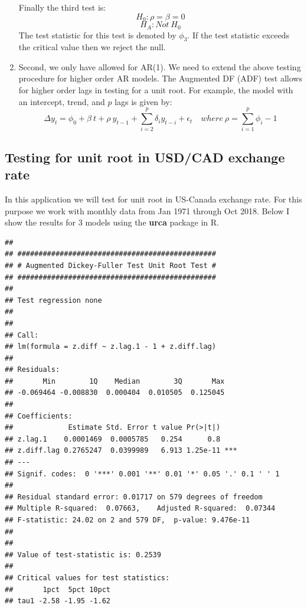 \documentclass[]{book}
\theoremstyle{definition}
\theoremstyle{definition}
\theoremstyle{definition}
\theoremstyle{remark}
\begin{document}
\begin{enumerate}
  Finally the third test is:
  \[H_0: \rho=\beta=0 \]
  \[H_A: Not \ H_0\]
  The test statistic for this test is denoted by \(\phi_3\). If the test statistic exceeds the critical value then we reject the null.
\item
  Second, we only have allowed for AR(1). We need to extend the above testing procedure for higher order AR models. The Augmented DF (ADF) test allows for higher order lags in testing for a unit root. For example, the model with an intercept, trend, and \(p\) lags is given by:
  \[\Delta y_t= \phi_0 + \beta \ t+ \rho \ y_{t-1}+\sum_{i=2}^p\delta_i  y_{t-i}+\epsilon_t  \quad where \ \rho=\sum_{i=1}^p \phi_i-1\]
\end{enumerate}

\hypertarget{testing-for-unit-root-in-usdcad-exchange-rate}{%
\subsection{Testing for unit root in USD/CAD exchange rate}\label{testing-for-unit-root-in-usdcad-exchange-rate}}

In this application we will test for unit root in US-Canada exchange rate. For this purpose we work with monthly data from Jan 1971 through Oct 2018. Below I show the results for 3 models using the \textbf{urca} package in R.

\begin{verbatim}
## 
## ############################################### 
## # Augmented Dickey-Fuller Test Unit Root Test # 
## ############################################### 
## 
## Test regression none 
## 
## 
## Call:
## lm(formula = z.diff ~ z.lag.1 - 1 + z.diff.lag)
## 
## Residuals:
##       Min        1Q    Median        3Q       Max 
## -0.069464 -0.008830  0.000404  0.010505  0.125045 
## 
## Coefficients:
##             Estimate Std. Error t value Pr(>|t|)    
## z.lag.1    0.0001469  0.0005785   0.254      0.8    
## z.diff.lag 0.2765247  0.0399989   6.913 1.25e-11 ***
## ---
## Signif. codes:  0 '***' 0.001 '**' 0.01 '*' 0.05 '.' 0.1 ' ' 1
## 
## Residual standard error: 0.01717 on 579 degrees of freedom
## Multiple R-squared:  0.07663,    Adjusted R-squared:  0.07344 
## F-statistic: 24.02 on 2 and 579 DF,  p-value: 9.476e-11
## 
## 
## Value of test-statistic is: 0.2539 
## 
## Critical values for test statistics: 
##       1pct  5pct 10pct
## tau1 -2.58 -1.95 -1.62
\end{verbatim}
\end{document}
